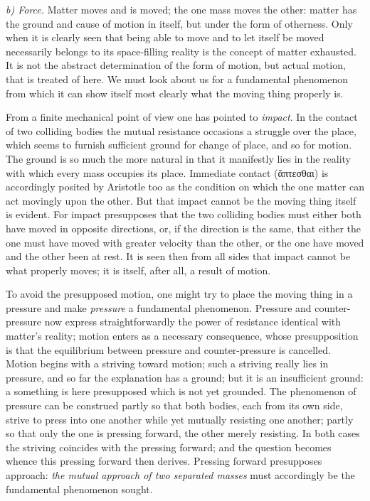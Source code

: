 \documentclass[12pt,a4paper]{book}
\newcommand{\runin}[1]{\emph{#1}\hspace{0.4em}}
\begin{document}
\runin{b) Force.} Matter moves and is moved; the one mass moves the other: matter has
the ground and cause of motion in itself, but under the form of otherness. Only when it
is clearly seen that being able to move and to let itself be moved necessarily belongs
to its space-filling reality is the concept of matter exhausted. It is not the abstract
determination of the form of motion, but actual motion, that is treated of here. We
must look about us for a
fundamental phenomenon from which it can show itself most clearly what the moving thing
properly is.

From a finite mechanical point of view one has pointed to \emph{impact}. In the contact
of two colliding bodies the mutual resistance occasions a struggle over the place, which
seems to furnish sufficient ground for change of place, and so for motion. The ground is
so much the more natural in that it manifestly lies in the reality with which every mass
occupies its place. Immediate contact
(ἅπτεσθαι) is accordingly posited by Aristotle too as the condition on which the one
matter can act movingly upon the other. But that impact cannot be the moving thing
itself is evident. For impact presupposes that the two colliding bodies must either both
have moved in opposite directions, or, if the direction is the same, that either the one
must have moved with greater velocity than the other, or the one have moved and the
other been at rest. It is seen then from all sides that impact cannot be what properly
moves; it is itself, after all, a result of motion.

To avoid the presupposed motion, one might try to place the moving thing in a pressure
and make \emph{pressure} a fundamental phenomenon. Pressure and counter-pressure now
express straightforwardly the power of resistance identical with matter's reality;
motion enters as a necessary consequence, whose presupposition is that the equilibrium
between pressure and counter-pressure is cancelled. Motion begins with a striving toward
motion; such a striving really lies in pressure, and so far the explanation has a
ground; but it is an insufficient ground: a something is here presupposed which is not
yet grounded. The phenomenon of pressure can be construed partly so that both bodies,
each from its own side, strive to press into one another while yet mutually resisting
one another; partly so that only the one is pressing forward, the other merely
resisting. In both cases the striving coincides with the pressing
forward; and the question becomes whence this pressing forward then derives. Pressing
forward presupposes approach: \emph{the mutual approach of two separated masses} must
accordingly be the fundamental phenomenon sought.
\end{document}
